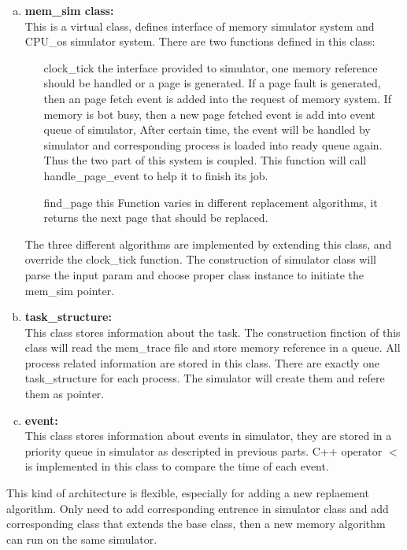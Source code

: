 \documentclass[12pt,a4paper]{article}
\begin{document}
\begin{enumerate}[\bf I]
\begin{enumerate}[a)]
\begin{enumerate}
					\end{enumerate}
				\item \textbf{mem\_sim class:}\\
					This is a virtual class, defines interface of memory simulator system and CPU\_os simulator system. There are two functions defined in this class:
					\begin{enumerate}
						\item [clock\_tick] the interface provided to simulator, one memory reference should be handled or a page is generated. If a page fault is generated, then an page fetch event is added into the request of memory system. If memory is bot busy, then a new page fetched event is add into event queue of simulator, After certain time, the event will be handled by simulator and corresponding process is loaded into ready queue again. Thus the two part of this system is coupled. This function will call handle\_page\_event to help it to finish its job.
						\item [find\_page] this Function varies in different replacement algorithms,  it returns the next page that should be replaced.
					\end{enumerate}
					The three different algorithms are implemented by extending this class, and override the clock\_tick function. The construction of simulator class will parse the input param and choose proper class instance to initiate the mem\_sim pointer. \\
				\item \textbf{task\_structure:}\\
					This class stores information about the task. The construction finction of this class will read the mem\_trace file and store memory reference in a queue. All process related information are stored  in this class. There are exactly one task\_structure for each process. The simulator will create them and refere them as pointer.
				\item \textbf{event:}\\
					This class stores information about events in simulator, they are stored in a priority queue in simulator as descripted in previous parts. C++ operator $<$ is implemented in this class to compare the time of each event.
			\end{enumerate}
			This kind of architecture is flexible, especially for adding a new replaement algorithm. Only need to add corresponding entrence in simulator class and add corresponding class that extends the base class, then a new memory algorithm can run on the same simulator. 
			

\end{enumerate}
\end{document}
